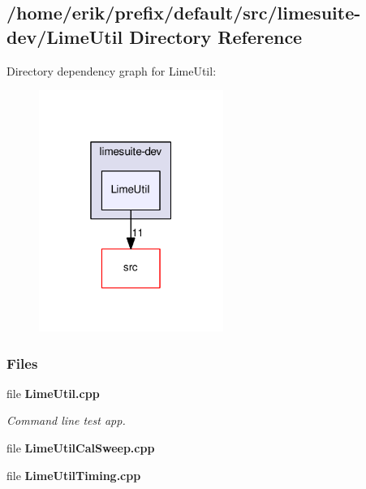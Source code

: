 \subsection{/home/erik/prefix/default/src/limesuite-\/dev/\+Lime\+Util Directory Reference}
\label{dir_d326994aa0da52ba9c263d75a0fbc50a}
Directory dependency graph for Lime\+Util\+:
\nopagebreak
\begin{figure}[H]
\begin{center}
\leavevmode
\includegraphics[width=170pt]{dir_d326994aa0da52ba9c263d75a0fbc50a_dep}
\end{center}
\end{figure}
\subsubsection*{Files}
\begin{DoxyCompactItemize}
\item 
file {\bf Lime\+Util.\+cpp}
\begin{DoxyCompactList}\small\item\em Command line test app. \end{DoxyCompactList}\item 
file {\bf Lime\+Util\+Cal\+Sweep.\+cpp}
\item 
file {\bf Lime\+Util\+Timing.\+cpp}
\end{DoxyCompactItemize}

